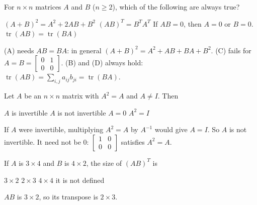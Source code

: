 \begin{question}[id=mat-3, type=msq, marks=2]
For $n \times n$ matrices $A$ and $B$ ($n \ge 2$), which of the following are always true?
\begin{options}
  \option $(A + B)^2 = A^2 + 2AB + B^2$
  \correct $(AB)^T = B^T A^T$
  \option If $AB = 0$, then $A = 0$ or $B = 0$.
  \correct $\operatorname{tr}(AB) = \operatorname{tr}(BA)$
\end{options}
\begin{solution}
(A) needs $AB = BA$: in general $(A+B)^2 = A^2 + AB + BA + B^2$. (C) fails for $A = B = \begin{bmatrix} 0 & 1 \\ 0 & 0 \end{bmatrix}$. (B) and (D) always hold: $\operatorname{tr}(AB) = \sum_{i,j} a_{ij}b_{ji} = \operatorname{tr}(BA)$.
\end{solution}
\end{question}

\begin{question}[id=mat-4, marks=2]
Let $A$ be an $n \times n$ matrix with $A^2 = A$ and $A \ne I$. Then
\begin{options}
  \option $A$ is invertible
  \correct $A$ is not invertible
  \option $A = 0$
  \option $A^2 = I$
\end{options}
\begin{solution}
If $A$ were invertible, multiplying $A^2 = A$ by $A^{-1}$ would give $A = I$. So $A$ is not invertible. It need not be 0: $\begin{bmatrix} 1 & 0 \\ 0 & 0 \end{bmatrix}$ satisfies $A^2 = A$.
\end{solution}
\end{question}

\begin{question}[id=mat-5]
If $A$ is $3 \times 4$ and $B$ is $4 \times 2$, the size of $(AB)^T$ is
\begin{options}
  \option $3 \times 2$
  \correct $2 \times 3$
  \option $4 \times 4$
  \option it is not defined
\end{options}
\begin{solution}
$AB$ is $3 \times 2$, so its transpose is $2 \times 3$.
\end{solution}
\end{question}


